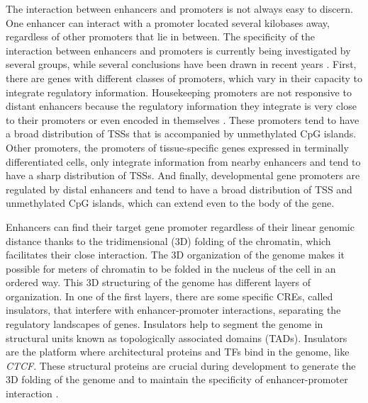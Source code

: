 The interaction between enhancers and promoters is not always easy to discern. One enhancer can interact with a promoter located several kilobases away, regardless of other promoters that lie in between. The specificity of the interaction between enhancers and promoters is currently being investigated by several groups, while several conclusions have been drawn in recent years \parencite{pachano_enhancer-gene_2022}. First, there are genes with different classes of promoters, which vary in their capacity to integrate regulatory information. Housekeeping promoters are not responsive to distant enhancers because the regulatory information they integrate is very close to their promoters or even encoded in themselves \parencite{zabidi_enhancercore-promoter_2015}. These promoters tend to have a broad distribution of TSSs that is accompanied by unmethylated CpG islands. Other promoters, the promoters of tissue-specific genes expressed in terminally differentiated cells, only integrate information from nearby enhancers and tend to have a sharp distribution of TSSs. And finally, developmental gene promoters are regulated by distal enhancers and tend to have a broad distribution of TSS and unmethylated CpG islands, which can extend even to the body of the gene. 

Enhancers can find their target gene promoter regardless of their linear genomic distance thanks to the tridimensional (3D) folding of the chromatin, which facilitates their close interaction. The 3D organization of the genome makes it possible for meters of chromatin to be folded in the nucleus of the cell in an ordered way. This 3D structuring of the genome has different layers of organization. In one of the first layers, there are some specific CREs, called insulators, that interfere with enhancer-promoter interactions, separating the regulatory landscapes of genes. Insulators help to segment the genome in structural units known as topologically associated domains (TADs). Insulators are the platform where architectural proteins and TFs bind in the genome, like \textit{CTCF}. These structural proteins are crucial during development to generate the 3D folding of the genome and to maintain the specificity of enhancer-promoter interaction \parencite{arzate-mejia_developing_2018, franke_ctcf_2021}. 

